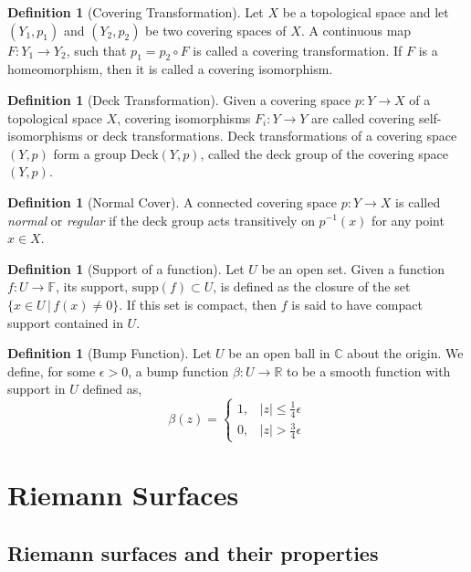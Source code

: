 \documentclass[11pt]{report}
\theoremstyle{definition}
\newtheorem{defn}[thm]{Definition}
\begin{document}
\begin{defn}[Covering Transformation]
  Let $X$ be a topological space and let $(Y_1,p_1)$ and $(Y_2,p_2)$ be two covering spaces of $X$. A continuous map $F:Y_1 \rightarrow Y_2$, such that $p_1 = p_2 \circ F$ is called a covering transformation. If $F$ is a homeomorphism, then it is called a covering isomorphism.
\end{defn}
\begin{defn}[Deck Transformation]
  Given a covering space $p:Y \rightarrow X$ of a topological space $X$,  covering isomorphisms $F_i:Y \rightarrow Y$ are called covering self-isomorphisms or deck transformations. Deck transformations of a covering space $(Y,p)$ form a group $\text{Deck}(Y,p)$, called the deck group of the covering space $(Y,p)$.
\end{defn}
\begin{defn}[Normal Cover]
A connected covering space $p:Y \rightarrow X$ is called \emph{normal} or \emph{regular} if the deck group acts transitively on $p^{-1}(x)$ for any point $x \in X$.
\end{defn}

\begin{defn}[Support of a function]
Let $U$ be an open set. Given a function $f: U \rightarrow \mathbb{F}$, its support, $\text{supp}(f) \subset U$, is defined as the closure of the set $\{x \in U \,\vert\, f(x)\neq 0\}$. If this set is compact, then $f$ is said to have compact support contained in $U$.
\end{defn}
\begin{defn}[Bump Function]
  Let $U$ be an open ball in $\mathbb{C}$ about the origin. We define, for some $\epsilon > 0$, a bump function $\beta: U \rightarrow \mathbb{R}$ to be a smooth function with support in $U$ defined as,
  \[
    \beta(z)=
    \begin{cases}
      1, &|z| \leq \frac{1}{4}\epsilon \\
      0, &|z| > \frac{3}{4}\epsilon
    \end{cases}
  \]
\end{defn}
\chapter{Riemann Surfaces}\label{RSChapter}
\section{Riemann surfaces and their properties}\label{bdefns}
\end{document}

